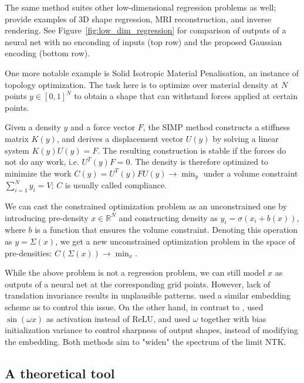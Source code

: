 \documentclass{article}
\newcommand{\RR}{\mathbb{R}}
\begin{document}
    The same method suites other low-dimensional regression problems as well; \cite{tancik2020fourier} provide examples of 3D shape regression, MRI reconstruction, and inverse rendering.
    See Figure~\ref{fig:low_dim_regression} for comparison of outputs of a neural net with no enconding of inputs (top row) and the proposed Gaussian encoding (bottom row).

    One more notable example is Solid Isotropic Material Penalisation, an instance of topology optimization.
    The task here is to optimize over material density at $N$ points $y \in [0,1]^N$ to obtain a shape that can withstand forces applied at certain points.

    Given a density $y$ and a force vector $F$, the SIMP method constructs a stiffness matrix $K(y)$, and derives a displacement vector $U(y)$ by solving a linear system $K(y) U(y) = F$.
    The resulting construction is stable if the forces do not do any work, i.e. $U^T(y) F = 0$.
    The density is therefore optimized to minimize the work $C(y) = U^T(y) F U(y) \to \min_y$ under a volume constraint $\sum_{i=1}^N y_i = V$; $C$ is usually called compliance.

    We can cast the constrained optimization problem as an unconstrained one by introducing pre-density $x \in \RR^N$ and constructing density as $y_i = \sigma(x_i + b(x))$, where $b$ is a function that ensures the volume constraint.
    Denoting this operation as $y = \Sigma(x)$, we get a new unconstrained optimization problem in the space of pre-densities: $C(\Sigma(x)) \to \min_x$.

    While the above problem is not a regression problem, we can still model $x$ as outputs of a neural net at the corresponding grid points.
    However, lack of translation invariance results in unplausible patterns.
    \cite{dupuis2021dnn} used a similar embedding scheme as \cite{tancik2020fourier} to control this issue.
    On the other hand, in contrast to \cite{tancik2020fourier}, \cite{dupuis2021dnn} used $\sin(\omega x)$ as activation instead of ReLU, and used $\omega$ together with bias initialization variance to control sharpness of output shapes, instead of modifying the embedding.
    Both methods aim to "widen" the spectrum of the limit NTK.


    \subsection{A theoretical tool}
    \label{sec:app_theory}
\end{document}
